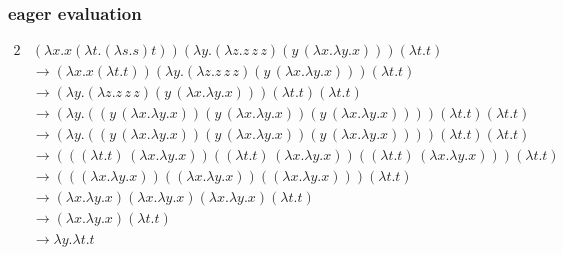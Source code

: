 \documentclass[a4papers]{ctexart}
\begin{document}
\subsubsection{eager evaluation}
\begin{alignat*}{2}
    & (\lambda x.x(\lambda t.(\lambda s.s)t) )(\lambda y.(\lambda z.z\, z\, z)(y\,(\lambda x.\lambda y.x)) )(\lambda t.t)\\
    &\rightarrow (\lambda x.x(\lambda t.t) )(\lambda y.(\lambda z.z\, z\, z)(y\,(\lambda x.\lambda y.x)) ) (\lambda t.t)\\
    &\rightarrow (\lambda y.(\lambda z.z\, z\, z)(y\,(\lambda x.\lambda y.x)) )(\lambda t.t) (\lambda t.t)\\
    &\rightarrow (\lambda y.((y\,(\lambda x.\lambda y.x))(y\,(\lambda x.\lambda y.x))(y\,(\lambda x.\lambda y.x))) )(\lambda t.t) (\lambda t.t)\\
    &\rightarrow (\lambda y.((y\,(\lambda x.\lambda y.x))(y\,(\lambda x.\lambda y.x))(y\,(\lambda x.\lambda y.x))) )(\lambda t.t) (\lambda t.t)\\
    &\rightarrow (((\lambda t.t)\,(\lambda x.\lambda y.x))((\lambda t.t)\,(\lambda x.\lambda y.x))((\lambda t.t)\,(\lambda x.\lambda y.x)))  (\lambda t.t)\\
    &\rightarrow (((\lambda x.\lambda y.x))((\lambda x.\lambda y.x))((\lambda x.\lambda y.x)))  (\lambda t.t)\\
    &\rightarrow (\lambda x.\lambda y.x)(\lambda x.\lambda y.x)(\lambda x.\lambda y.x)  (\lambda t.t)\\
    &\rightarrow (\lambda x.\lambda y.x)  (\lambda t.t)\\
    &\rightarrow  \lambda y.\lambda t.t  
\end{alignat*}
\end{document}
